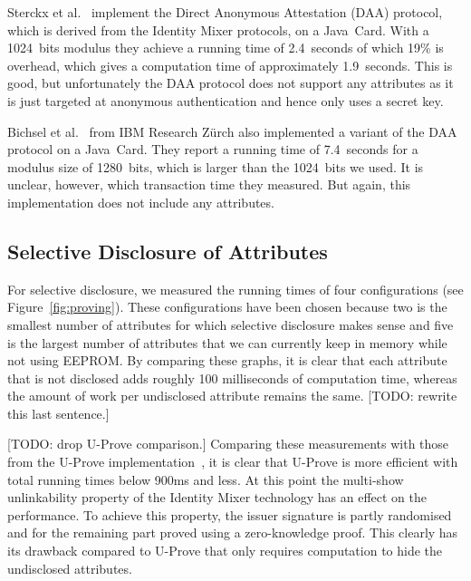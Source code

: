 Sterckx et al.~\cite{Sterckx09} implement the Direct Anonymous Attestation (DAA)
protocol, which is derived from the Identity Mixer protocols, on a Java~Card.
With a 1024~bits modulus they achieve a running time of 2.4~seconds of which
19\% is overhead, which gives a computation time of approximately 1.9~seconds.
This is good, but unfortunately the DAA protocol does not support any attributes
as it is just targeted at anonymous authentication and hence only uses a secret
key.

Bichsel et al.~\cite{BichselCGS2009} from IBM Research Z\"urch also implemented
a variant of the DAA protocol on a Java~Card. They report a running time of
7.4~seconds for a modulus size of 1280~bits, which is larger than the 1024~bits
we used. It is unclear, however, which transaction time they measured. But
again, this implementation does not include any attributes.

\subsection{Selective Disclosure of Attributes}

For selective disclosure, we measured the running times of four configurations
(see Figure~\ref{fig:proving}). These configurations have been chosen because
two is the smallest number of attributes for which selective disclosure makes
sense and five is the largest number of attributes that we can currently keep in
memory while not using EEPROM. By comparing these graphs, it is clear that each
attribute that is not disclosed adds roughly 100 milliseconds of computation
time, whereas the amount of work per undisclosed attribute remains the same.
[TODO: rewrite this last sentence.]

[TODO: drop U-Prove comparison.]
Comparing these measurements with those from the U-Prove
implementation~\cite{MostowskiVullers11}, it is clear that U-Prove is more
efficient with total running times below 900ms and less. At this point the
multi-show unlinkability property of the Identity Mixer technology has an effect
on the performance. To achieve this property, the issuer signature is partly
randomised and for the remaining part proved using a zero-knowledge proof. This
clearly has its drawback compared to U-Prove that only requires computation to
hide the undisclosed attributes.

